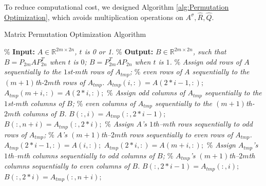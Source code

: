 \documentclass[conference]{IEEEtran}
\numberwithin{equation}{section}
\begin{document}
{\color{red}To reduce computational cost, we designed Algorithm \cref{alg:Permutation Optimization}, which avoids multiplication operations on $A^\sigma, \widehat{R}, \widehat{Q}$.}\fi
\begin{algorithm}[htbp]
    \caption{Matrix Permutation Optimization Algorithm}
    \label{alg:Permutation Optimization}
    \begin{algorithmic}[1]
        \State \% \textbf{Input:} \textit{$ A\in \mathbb{R}^{2m\times 2n}$, $t$ is 0 or 1.}
        \State \% \textbf{Output:} \textit{$B \in\mathbb{R}^{2m\times 2n}$, such that $B=P_{2m}AP_{2n}^T$ when $t$ is $0$;  $B=P_{2m}^TAP_{2n}$ when $t$ is $1$.}
        \State
            \State \% \textit{Assign odd rows of $A$ sequentially to the $1$st-$m$th rows of $A_{tmp}$; }
            \State \% \textit{even rows of $A$ sequentially to the $(m+1)$th-$2m$th rows of $A_{tmp}$.}
                \State $A_{tmp}(i, :) = A(2*i-1, :);$
                \State $A_{tmp}(m+i, :) = A(2*i, :);$
            \End
            \State \% \textit{Assign odd columns of $A_{tmp}$ sequentially to the $1$st-$m$th columns of $B$; }
            \State \% \textit{even columns of $A_{tmp}$ sequentially to the $(m+1)$th-$2m$th columns of $B$.}
                \State $B(:, i) = A_{tmp}(:, 2*i-1);$
                \State $B(:, n+i) = A_{tmp}(:, 2*i);$
            \End
        \Else  
            \State \% \textit{Assign $A$'s $1$th--$m$th rows sequentially to odd rows of $A_{tmp}$;}
            \State \% \textit{$A$'s $(m+1)$th--$2m$th rows sequentially to even rows of $A_{tmp}$.}
                \State $A_{tmp}(2*i-1, :) = A(i, :);$
                \State $A_{tmp}(2*i, :) = A(m+i, :);$
            \End
            \State \% \textit{Assign $A_{tmp}$'s $1$th--$m$th columns sequentially to odd columns of $B$;}
            \State \% \textit{$A_{tmp}$'s $(m+1)$th--$2m$th columns sequentially to even columns of $B$.}
                \State $B(:, 2*i-1) = A_{tmp}(:, i);$
                \State $B(:, 2*i) = A_{tmp}(:, n+i);$
            \End
        \End
    \End 
    \end{algorithmic}
\end{algorithm}
\vspace{.3cm}
\end{document}
